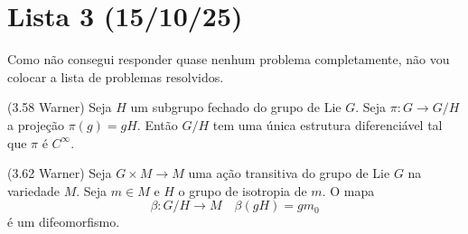 \clearpage
\section{Lista 3 (15/10/25)}

Como não consegui responder quase nenhum problema completamente, não vou colocar a lista de problemas resolvidos.

\begin{theorem}
    \label{trm:quotient_manifolds} (3.58 Warner) Seja $H$ um subgrupo fechado do grupo de Lie $G$. Seja $\pi : G \to G/H$ a projeção
    $\pi(g) = gH$. Então $G/H$ tem uma única estrutura diferenciável tal que $\pi$ é $C^\infty$.
\end{theorem}

\begin{theorem}
    \label{trm:isotropy_manifolds} (3.62 Warner) Seja $G \times M \to M$ uma ação transitiva do grupo de Lie $G$ na variedade $M$. Seja $m \in M$
    e $H$ o grupo de isotropia de $m$. O mapa 
    $$\beta: G/H \to M \quad \beta(gH) = gm_0$$
    é um difeomorfismo. 
\end{theorem}



